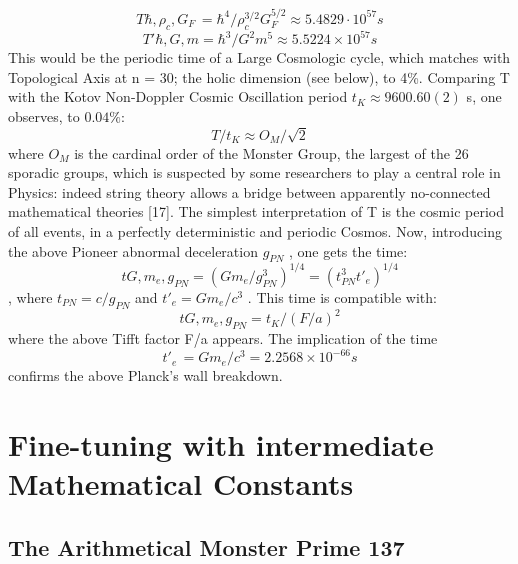 \documentclass[twoside,draft]{article}
\begin{document}
{\begin{equation}
T{\hbar,\rho_{c} ,G_{F} }\, = \hbar^{4} /\rho_{c}^{3/2} G_{F}^{5/2} \approx 5.4829 \cdot 10^{57} s
\end{equation}
$$T\prime{\hbar,G,m} = \hbar^{3} /G^{2} m^{5} \approx 5.5224 \times 10^{57} s$$
This would be the periodic time of a Large Cosmologic cycle, which matches with Topological Axis at n = 30;
the holic dimension (see below), to 4\%. Comparing T with the Kotov Non-Doppler Cosmic
Oscillation period $t_{K} \approx 9600.60(2)$ s, one observes, to $0.04\%$:
$$T/t_{K} \approx O_{M} /\sqrt{2}$$
where $O_{M}$ is the cardinal order of the Monster Group, the largest of the 26 sporadic groups, which is
suspected by some researchers to play a central role in Physics: indeed string theory allows a bridge
between apparently no-connected mathematical theories \cite{Borcherds}[17]. The simplest interpretation of T is the
cosmic period of all events, in a perfectly deterministic and periodic Cosmos.
Now, introducing the above Pioneer abnormal deceleration $g_{PN}$ , one gets the time: 
\begin{equation}
t{G, m_{e} , g_{PN} } = (Gm_{e} /g_{PN}^{3} )^{1/4} = (t_{PN}^{3} t\prime_{e} )^{1/4}
\end{equation}, where $t_{PN} = c/g_{PN}$ and $t\prime_{e} = Gm_{e} /c^{3}$ . This time is compatible with:
\begin{equation}
t{G, m_{e} , g_{PN} } = t_{K} /(F/a)^{2}
\end{equation}
where the above Tifft factor F/a appears. The implication of the time 
\begin{equation}
t\prime_{e}\, = Gm_{e} /c^{3} = 2.2568 \times 10^{-66} s
\end{equation}
confirms the above Planck's wall breakdown.

\section{Fine-tuning with intermediate Mathematical Constants}
\subsection{The Arithmetical Monster Prime 137}

}
\end{document}
